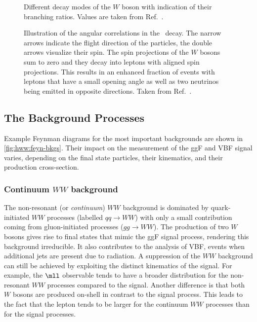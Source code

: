 \begin{figure}
    \caption[Different decay modes of the $W$ boson with indication of their branching ratios.]{Different decay modes of the $W$ boson with indication of their branching ratios. Values are taken from Ref.~\cite{PDG2020}.}
    \label{fig:w-branching-ratios}
\end{figure}

\begin{figure}
    \caption[Angular correlations in the \HWWdet\ decay.]{Illustration of the angular correlations in the \HWWdet\ decay. The narrow arrows indicate the flight direction of the particles, the double arrows visualize their spin. The spin projections of the $W$ bosons sum to zero and they decay into leptons with aligned spin projections. This results in an enhanced fraction of events with leptons that have a small opening angle as well as two neutrinos being emitted in opposite directions. Taken from Ref.~\cite{PhysRevD.92.012006}.}
    \label{fig:spin-correlations}
\end{figure}

\subsection{The Background Processes}
Example Feynman diagrams for the most important backgrounds are shown in \cref{fig:hww:feyn-bkgs}.
Their impact on the measurement of the ggF and VBF signal varies, depending on the final state particles, their kinematics, and their production cross-section. 

\subsubsection{Continuum $WW$ background}
The non-resonant (or \emph{continuum}) $WW$ background is dominated by quark-initiated $WW$ processes (labelled $qq \to WW$) with only a small contribution coming from gluon-initiated processes ($gg \to WW$). 
The production of two $W$ bosons gives rise to final states that mimic the ggF signal process, rendering this background irreducible. 
It also contributes to the analysis of VBF, \HWW events when additional jets are present due to radiation. 
A suppression of the $WW$ background can still be achieved by exploiting the distinct kinematics of the signal. For example, the $\mll$ observable tends to have a broader distribution for the non-resonant $WW$ processes compared to the signal. 
Another difference is that both $W$ bosons are produced on-shell in contrast to the signal process. 
This leads to the fact that the lepton \pT tends to be larger for the continuum $WW$ processes than for the signal processes.


